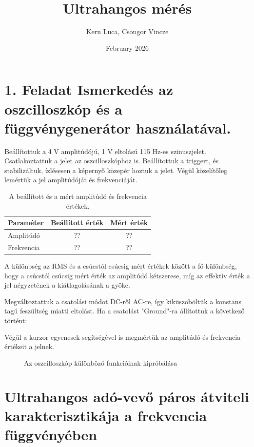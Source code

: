 \documentclass{article}
\title{Ultrahangos mérés}
\author{Kern Luca, Csongor Vincze}
\date{February 2026}
\begin{document}
\maketitle

\section{1. Feladat Ismerkedés az oszcilloszkóp és a függvénygenerátor használatával.}

Beállítottuk a 4 V amplitúdójú, 1 V eltolású 115 Hz-es szinuszjelet. Csatlakoztattuk a jelet az oszcilloszkóphoz is. Beállítottuk a triggert, és stabilizáltuk, ízlésesen a képernyő közepér hoztuk a jelet.
Végül közelítőleg lemértük a jel amplitúdóját és frekvenciáját.

\begin{table}[h!]
    \centering
    \begin{tabular}{|l|c|c|}
        \hline
        Paraméter & Beállított érték & Mért érték \\ \hline
        Amplitúdó & ?? & ?? \\ \hline
        Frekvencia & ?? & ?? \\ \hline
    \end{tabular}
    \caption{A beállított és a mért amplitúdó és frekvencia értékek.}
    \label{tab:amplitudo_frekvencia}
\end{table}

A különbség az RMS és a csúcstól csúcsig mért értékek között a fő különbség, hogy a csúcstól csúcsig mért érték az amplitúdó kétszerese, míg az effektív érték a jel négyzetének a kiátlagolásának a gyöke.

Megváltoztattuk a csatolási módot DC-ről AC-re, így kiküszöböltük a konstans tagú feszültség miatti eltolást.
Ha a csatolást "Ground"-ra állítottuk a következő történt:

Végül a kurzor egyenesek segítségével is megmértük az amplitúdó és frekvencia értékeit a jelnek.


\begin{figure}[htp]
    \centering
    \caption{Az oszcilloszkóp különböző funkcióinak kipróbálása}
    \label{probalkozas}
\end{figure}

\section{Ultrahangos adó-vevő páros átviteli karakterisztikája
a frekvencia függvényében}
\end{document}
